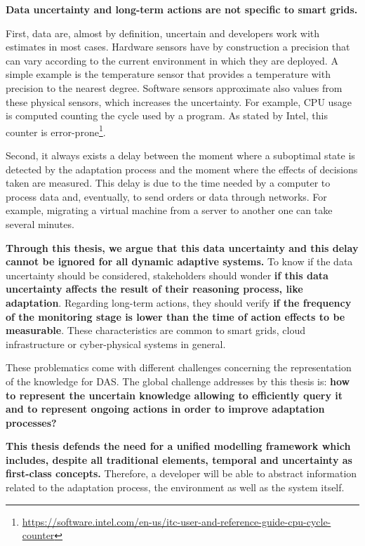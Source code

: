 \bigskip
{}
\textbf{Data uncertainty and long-term actions are not specific to smart grids.}

First, data are, almost by definition, uncertain and developers work with estimates in most cases.
Hardware sensors have by construction a precision that can vary according to the current environment in which they are deployed.
A simple example is the temperature sensor that provides a temperature with precision to the nearest degree.
Software sensors approximate also values from these physical sensors, which increases the uncertainty.
For example, CPU usage is computed counting the cycle used by a program.
As stated by Intel, this counter is error-prone\footnote{\url{https://software.intel.com/en-us/itc-user-and-reference-guide-cpu-cycle-counter}}.

Second, it always exists a delay between the moment where a suboptimal state is detected by the adaptation process and the moment where the effects of decisions taken are measured.
This delay is due to the time needed by a computer to process data and, eventually, to send orders or data through networks.
For example, migrating a virtual machine from a server to another one can take several minutes.

\textbf{Through this thesis, we argue that this data uncertainty and this delay cannot be ignored for all dynamic adaptive systems.}
To know if the data uncertainty should be considered, stakeholders should wonder \textbf{if this data uncertainty affects the result of their reasoning process, like adaptation}.
Regarding long-term actions, they should verify \textbf{if the frequency of the monitoring stage is lower than the time of action effects to be measurable}.
These characteristics are common to smart grids, cloud infrastructure or cyber-physical systems in general.

\bigskip
{}
These problematics come with different challenges concerning the representation of the knowledge for DAS.
The global challenge addresses by this thesis is: \textbf{how to represent the uncertain knowledge allowing to efficiently query it and to represent ongoing actions in order to improve adaptation processes?}

\bigskip
{}
\textbf{This thesis defends the need for a unified modelling framework which includes, despite all traditional elements, temporal and uncertainty as first-class concepts.}
Therefore, a developer will be able to abstract information related to the adaptation process, the environment as well as the system itself.

